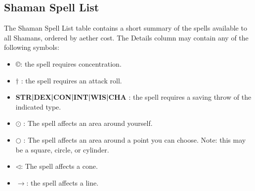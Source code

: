 \subsection{Shaman Spell List}
The Shaman Spell List table contains a short summary of the spells available to all Shamans, ordered by aether cost. The Details column may contain any of the following symbols:
\begin{itemize}
	\item \copyright : the spell requires concentration.
	\item $\dagger$ : the spell requires an attack roll.
	\item \textbf{STR|DEX|CON|INT|WIS|CHA} : the spell requires a saving throw of the indicated type.
	\item $\odot$ : The spell affects an area around yourself.
	\item $\bigcirc$ : The spell affects an area around a point you can choose. Note: this may be a square, circle, or cylinder.
	\item $\triangleleft$: The spell affects a cone.
	\item $\rightarrow$: the spell affects a line.
\end{itemize}

